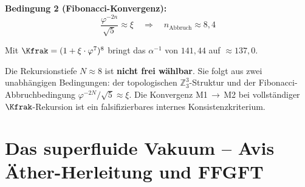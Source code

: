 \textbf{Bedingung 2 (Fibonacci-Konvergenz):}
\[
  \frac{\varphi^{-2n}}{\sqrt{5}} \approx \xi \quad \Rightarrow \quad n_{\text{Abbruch}} \approx 8{,}4
\]

Mit $\Kfrak = (1 + \xi\cdot\varphi^7)^8$ bringt das $\alpha^{-1}$ von $141{,}44$ auf $\approx 137{,}0$.

\begin{keyresult}[Konvergenzkriterium]
Die Rekursionstiefe $N \approx 8$ ist \textbf{nicht frei wählbar}. Sie folgt aus zwei unabhängigen Bedingungen: der topologischen $\mathbb{Z}_3^3$-Struktur und der Fibonacci-Abbruchbedingung $\varphi^{-2N}/\!\sqrt{5} \approx \xi$. Die Konvergenz M1\,$\to$\,M2 bei vollständiger $\Kfrak$-Rekursion ist ein falsifizierbares internes Konsistenzkriterium.
\end{keyresult}

\section{Das superfluide Vakuum -- Avis Äther-Herleitung und FFGFT}


